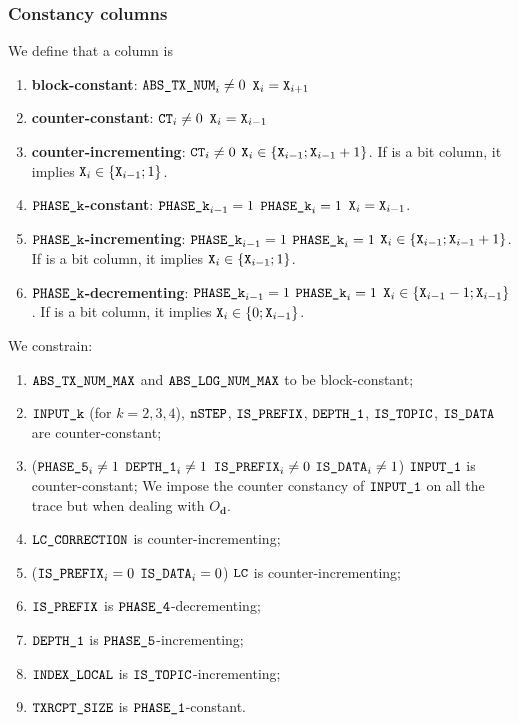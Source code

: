 \subsubsection{Constancy columns} \label{constancy_constraints}
We define that a column  is
\begin{enumerate}
    \item \textbf{block-constant}: \If $\texttt{ABS\_TX\_NUM}_{i} \neq 0$ \Then $\texttt{X}_{i}=\texttt{X}_{i+1}$
    \item \textbf{counter-constant}: \If $\texttt{CT}_{i} \neq 0$ \Then $\texttt{X}_{i}=\texttt{X}_{i-1}$
    \item \textbf{counter-incrementing}: \If $\texttt{CT}_{i} \neq 0$ \Then $\texttt{X}_{i} \in \{\texttt{X}_{i-1}; \texttt{X}_{i-1} +1 \}$. If  is a bit column, it implies $\texttt{X}_{i} \in \{\texttt{X}_{i-1}; 1 \}$.
    \item \textbf{$\bm{\texttt{PHASE\_k}}$-constant}: \If $\texttt{PHASE\_k}_{i-1} = 1$ \et $\texttt{PHASE\_k}_{i}=1$ \Then $\texttt{X}_{i}=\texttt{X}_{i-1}$.
    \item \textbf{$\texttt{PHASE\_k}$-incrementing}: \If $\texttt{PHASE\_k}_{i-1} = 1$ \et $\texttt{PHASE\_k}_{i}=1$ \Then $\texttt{X}_{i} \in \{\texttt{X}_{i-1}; \texttt{X}_{i-1} +1 \}$. If  is a bit column, it implies $\texttt{X}_{i} \in \{\texttt{X}_{i-1}; 1 \}$.
    \item \textbf{$\bm{\texttt{PHASE\_k}}$-decrementing}: \If $\texttt{PHASE\_k}_{i-1} = 1$ \et $\texttt{PHASE\_k}_{i}=1$ \Then $\texttt{X}_{i} \in \{\texttt{X}_{i-1} -1; \texttt{X}_{i-1} \}$. If  is a bit column, it implies $\texttt{X}_{i} \in \{0 ; \texttt{X}_{i-1}\}$.
\end{enumerate}

We constrain:
\begin{enumerate}
    \item $\texttt{ABS\_TX\_NUM\_MAX}$ and $\texttt{ABS\_LOG\_NUM\_MAX}$ to be block-constant;
    \item $\texttt{INPUT\_k}$ (for $k= 2, 3, 4$), $\texttt{nSTEP}$, $\texttt{IS\_PREFIX}$, $\texttt{DEPTH\_1}$, $\texttt{IS\_TOPIC}$, $\texttt{IS\_DATA}$  are counter-constant;
    \item \If ($\texttt{PHASE\_5}_{i} \neq 1$ \Or $\texttt{DEPTH\_1}_{i} \neq 1$ \Or $\texttt{IS\_PREFIX}_{i} \neq 0$ \Or $\texttt{IS\_DATA}_{i} \neq 1$) \Then $\texttt{INPUT\_1}$ is counter-constant;
    \saNote{} We impose the counter constancy of $\texttt{INPUT\_1}$ on all the trace but when dealing with $O_{\textbf{d}}$.

    \item $\texttt{LC\_CORRECTION}$ is counter-incrementing;
    \item \If ($\texttt{IS\_PREFIX}_{i}=0$ \Or $\texttt{IS\_DATA}_{i}=0$) \Then $\texttt{LC}$ is counter-incrementing;
    \item $\texttt{IS\_PREFIX}$ is $\texttt{PHASE\_4}$-decrementing;
    \item $\texttt{DEPTH\_1}$ is $\texttt{PHASE\_5}$-incrementing;
    \item $\texttt{INDEX\_LOCAL}$ is $\texttt{IS\_TOPIC}$-incrementing;
    \item $\texttt{TXRCPT\_SIZE}$ is $\texttt{PHASE\_1}$-constant.
\end{enumerate}

